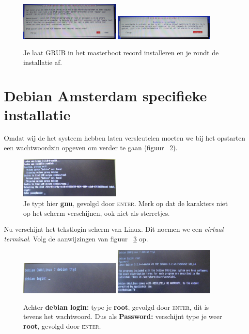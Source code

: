 \documentclass[12pt,a4paper]{article}
\begin{document}
\begin{figure}[H]
\centering
\includegraphics[width=0.45\textwidth]{grub-installatie-scherm}
\includegraphics[width=0.45\textwidth]{installatie-afronden-scherm}
\caption{Je laat GRUB in het masterboot record installeren en je rondt de installatie af.}
\label{fig:grub}
\end{figure}

\section{Debian Amsterdam specifieke installatie}

Omdat wij de het systeem hebben laten versleutelen moeten we bij het opstarten een wachtwoordzin opgeven om verder te gaan (figuur ~\ref{fig:diskwachtwoord}).

\begin{figure}[H]
\centering
\includegraphics[width=0.45\textwidth]{diskwachtwoordzin-scherm}
\caption{Je typt hier \textbf{gnu}, gevolgd door \textsc{enter}. Merk op dat de karakters niet op het scherm verschijnen, ook niet als sterretjes.}
\label{fig:diskwachtwoord}
\end{figure}

Nu verschijnt het tekstlogin scherm van Linux. Dit noemen we een \textit{virtual terminal}. Volg de aanwijzingen van figuur ~\ref{fig:loginprompt} op.

\begin{figure}[H]
\centering
\includegraphics[width=0.45\textwidth]{loginprompt-scherm}
\includegraphics[width=0.45\textwidth]{ingelogd-scherm}
\caption{Achter \textbf{debian login:} type je \textbf{root}, gevolgd door \textsc{enter}, dit is tevens het wachtwoord. Dus als \textbf{Password:} verschijnt type je weer \textbf{root}, gevolgd door \textsc{enter}.}
\label{fig:loginprompt}
\end{figure}
\end{document}
